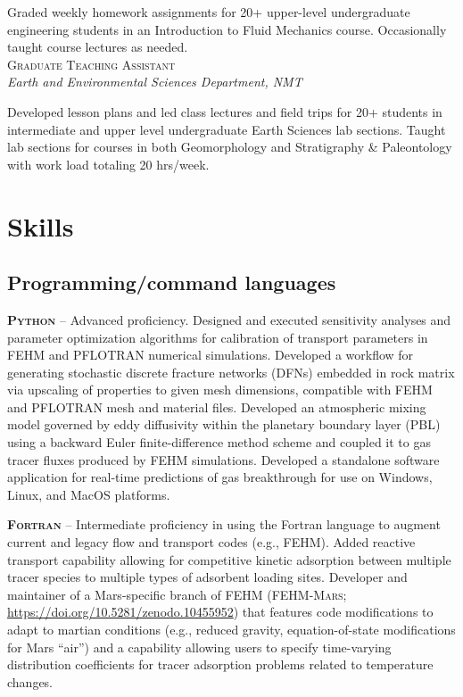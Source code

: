 \documentclass[11pt, letterpaper]{article}
\newcommand{\years}[1]{\marginnote{\scriptsize #1}}
\begin{document}
	Graded weekly homework assignments for 20+ upper-level undergraduate
	engineering students in an Introduction to Fluid Mechanics course.
	Occasionally taught course lectures as needed.\\

\years{2015 - 2016}\textsc{Graduate Teaching Assistant}\\
\textit{Earth and Environmental Sciences Department, NMT}

    Developed lesson plans and led class lectures and field trips for 20+
    students in intermediate and upper level undergraduate Earth Sciences lab
    sections. Taught lab sections for courses in both Geomorphology and Stratigraphy
    \& Paleontology with work load totaling 20 hrs/week.  

\section*{Skills}
\setlength{\parskip}{5pt}
\subsection*{Programming/command languages}
\noindent
\textbf{\textsc{Python}} -- Advanced proficiency. Designed and executed
sensitivity analyses and parameter optimization algorithms for calibration of transport
parameters in FEHM and PFLOTRAN numerical simulations. Developed a workflow for
generating stochastic discrete fracture networks (DFNs) embedded in rock matrix
via upscaling of properties to given mesh dimensions, compatible with FEHM and
PFLOTRAN mesh and material files. Developed an atmospheric mixing model
governed by eddy diffusivity within the planetary boundary layer (PBL) using a
backward Euler finite-difference method scheme and coupled it to gas tracer
fluxes produced by FEHM simulations. Developed a standalone software
application for real-time predictions of gas breakthrough for use on Windows,
Linux, and MacOS platforms.

\textbf{\textsc{Fortran}} -- Intermediate proficiency in using the Fortran
language to augment current and legacy flow and transport codes (e.g.,
\textsc{FEHM}). Added reactive transport capability allowing for competitive
kinetic adsorption between multiple tracer species to multiple types of
adsorbent loading sites.  Developer and maintainer of a Mars-specific branch of
\textsc{FEHM} (\textsc{FEHM-Mars};
\href{https://doi.org/10.5281/zenodo.10455952}{https://doi.org/10.5281/zenodo.10455952})
that features code modifications to adapt to martian conditions (e.g., reduced
gravity, equation-of-state modifications for Mars ``air'') and a capability
allowing users to specify time-varying distribution coefficients for tracer
adsorption problems related to temperature changes.
\end{document}
